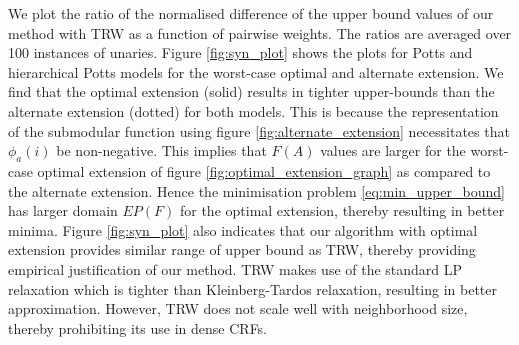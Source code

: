  We plot the ratio of the normalised difference of the upper
bound values of our method with TRW as a function of pairwise weights. The
ratios are averaged over 100 instances of unaries. Figure \ref{fig:syn_plot}
shows the plots for Potts and hierarchical Potts models for the worst-case
optimal and alternate extension. We find that the optimal extension (solid) results 
in tighter upper-bounds than the alternate extension (dotted) for both models.
This is because the representation of the submodular function using figure \ref{fig:alternate_extension} necessitates that $\phi_a(i)$ be non-negative. This implies that $F(A)$ values are larger
for the worst-case optimal extension of figure \ref{fig:optimal_extension_graph} as compared to the
alternate extension. Hence the minimisation problem \ref{eq:min_upper_bound}
has larger domain $EP(F)$ for the optimal extension, thereby resulting in better minima. Figure \ref{fig:syn_plot} also indicates that our algorithm with optimal extension provides similar range of upper bound as TRW, thereby providing empirical justification of our
method. TRW makes use of the standard LP relaxation \citep{chekuri2004linear} which is tighter than Kleinberg-Tardos relaxation, resulting in better approximation. However, TRW does not scale well with neighborhood size, thereby prohibiting its use in dense CRFs.

